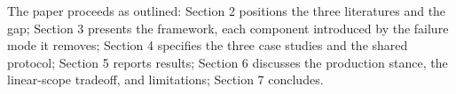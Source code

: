 The paper proceeds as outlined: Section 2 positions the three literatures and the gap;
Section 3 presents the framework, each component introduced by the failure mode it
removes; Section 4 specifies the three case studies and the shared protocol; Section 5
reports results; Section 6 discusses the production stance, the linear-scope tradeoff,
and limitations; Section 7 concludes.
